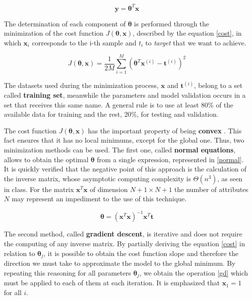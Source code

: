 \documentclass[10pt,twocolumn,letterpaper]{article}
\begin{document}
\begin{equation}
\label {lr}
\bm{y} = \bm{\theta}^T\bm{x}
\end{equation}

The determination of each component of \(\bm{\theta}\) is performed through the minimization of the cost function \(J(\bm{\theta}, \bm{x})\), described by the equation \ref{cost}, in which \(\bm{x}_ i\) corresponds to the i-th sample and \(t_ i\) to \textit{target} that we want to achieve.

\begin{equation}
\label {cost}
J(\bm{\theta}, \bm{x}) = \frac{1}{2M} \displaystyle\sum_{i=1}^{M} \left(\bm{\theta}^T\bm{x}^{(i)} - \bm{t}^{(i)}\right)^2
\end{equation}

The datasets used during the minimization process,  \(\bm{x}\) and \(\bm{t}^{(i)}\), belong to a set called \textbf{training set}, meanwhile the parameters and model validation occurs in a set that receives this same name. A general rule is to use at least 80\% of the available data for training and the rest, 20\%, for testing and validation.

The cost function \(J(\bm{\theta}, \bm{x})\) has the important property of being  \textbf{convex} \cite{Bishop:2006:PRM:1162264}. This fact ensures that it has no local minimums, except for the global one. Thus, two minimization methods can be used. The first one, called \textbf{normal equations},  allows to obtain the optimal \(\bm{\theta}\)  from a single expression, represented in \ref{normal}. It is quickly verified that the negative point of this approach is the calculation of the inverse matrix, whose asymptotic computing complexity is \(\Theta(n^3)\), as seen in class. For the matrix \(\bm{x}^T\bm{x}\) of dimension \(N+1 \times N+1 \) the number of attributes \(N\) may represent an impediment to the use of this technique.

\begin{equation}
\label {normal}
\bm{\theta} = \left(\bm{x}^T\bm{x}\right)^{-1} \bm{x}^T \bm{t}
\end{equation}

The second method, called \textbf {gradient descent}, is iterative and does not require the computing of any inverse matrix. By partially deriving the equation \ref{cost} in relation to \(\bm{\theta}_j\), it is possible to obtain the cost function slope and therefore the direction we must take to approximate the model to the global minimum. By repeating this reasoning for all parameters \(\bm{\theta}_j\), we obtain the operation \ref{gd} which must be applied to each of them at each iteration. It is emphasized that \(\bm{x}_1 = 1\) for all \(i\).
\end{document}
